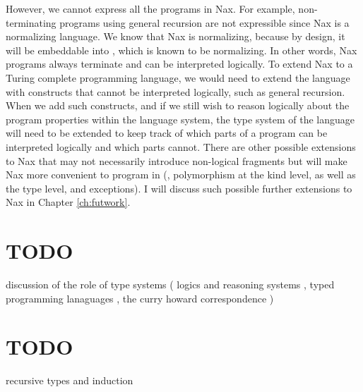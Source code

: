 However, we cannot express all the programs in Nax. For example,
non-terminating programs using general recursion are not expressible since
Nax is a normalizing language. We know that Nax is normalizing, because
by design, it will be embeddable into \Fi, which is known to be normalizing.
In other words, Nax programs always terminate and can be interpreted logically.
To extend Nax to a Turing complete programming language, we would need to
extend the language with constructs that cannot be interpreted logically,
such as general recursion. When we add such constructs, and if we still wish
to reason logically about the program properties within the language system,
the type system of the language will need to be extended to keep track of
which parts of a program can be interpreted logically and which parts cannot.
There are other possible extensions to Nax that may not necessarily introduce
non-logical fragments but will make Nax more convenient to program in (\eg,
polymorphism at the kind level, as well as the type level, and exceptions).
I will discuss such possible further extensions to Nax
in Chapter \ref{ch:futwork}.



\section{TODO}
discussion of the role of type systems
( logics and reasoning systems
, typed programming lanaguages
, the curry howard correspondence
)

\section{TODO}
recursive types and induction

